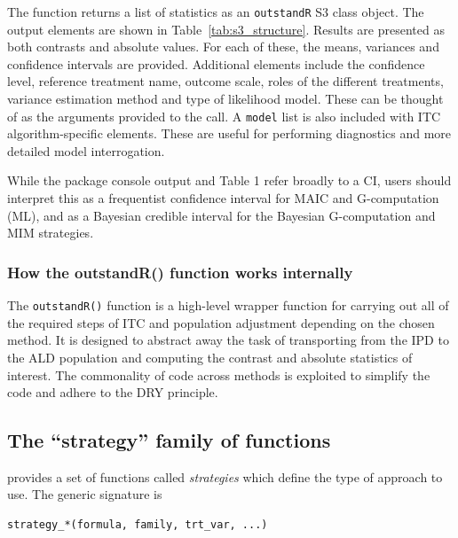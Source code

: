 \documentclass[article]{jss}
\begin{document}
The function returns a list of statistics as an \texttt{outstandR} S3 class object. The output elements are shown in Table~\ref{tab:s3_structure}. Results are presented as both contrasts and absolute values. For each of these, the means, variances and confidence intervals are provided. Additional elements include the confidence level, reference treatment name, outcome scale, roles of the different treatments, variance estimation method and type of likelihood model. These can be thought of as the arguments provided to the call. A \texttt{model} list is also included with ITC algorithm-specific elements. These are useful for performing diagnostics and more detailed model interrogation.

While the package console output and Table 1 refer broadly to a CI, users should interpret this as a frequentist confidence interval for MAIC and G-computation (ML), and as a Bayesian credible interval for the Bayesian G-computation and MIM strategies.

\subsubsection{How the outstandR() function works internally}
The \texttt{outstandR()} function is a high-level wrapper function for carrying out all of the required steps of ITC and population adjustment depending on the chosen method. It is designed to abstract away the task of transporting from the IPD to the ALD population and computing the contrast and absolute statistics of interest. The commonality of code across methods is exploited to simplify the code and adhere to the DRY principle. 

\subsection{The ``strategy'' family of functions}
 provides a set of functions called {\it strategies} which define the type of approach to use. The generic signature is

\begin{verbatim}
strategy_*(formula, family, trt_var, ...)
\end{verbatim}
\end{document}
